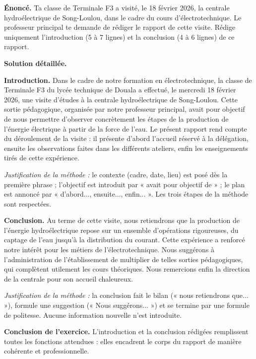 \documentclass[11pt]{article}
\begin{document}
\begin{exoresolu}
\textbf{Énoncé.} Ta classe de Terminale F3 a visité, le 18 février 2026, la centrale hydroélectrique de Song-Loulou, dans le cadre du cours d'électrotechnique. Le professeur principal te demande de rédiger le rapport de cette visite. Rédige uniquement l'introduction (5 à 7 lignes) et la conclusion (4 à 6 lignes) de ce rapport.

\tcblower
\textbf{Solution détaillée.}

\textbf{Introduction.} Dans le cadre de notre formation en électrotechnique, la classe de Terminale F3 du lycée technique de Douala a effectué, le mercredi 18 février 2026, une visite d'études à la centrale hydroélectrique de Song-Loulou. Cette sortie pédagogique, organisée par notre professeur principal, avait pour objectif de nous permettre d'observer concrètement les étapes de la production de l'énergie électrique à partir de la force de l'eau. Le présent rapport rend compte du déroulement de la visite : il présente d'abord l'accueil réservé à la délégation, ensuite les observations faites dans les différents ateliers, enfin les enseignements tirés de cette expérience.

\textit{Justification de la méthode :} le contexte (cadre, date, lieu) est posé dès la première phrase ; l'objectif est introduit par « avait pour objectif de » ; le plan est annoncé par « d'abord..., ensuite..., enfin... ». Les trois étapes de la méthode sont respectées.

\textbf{Conclusion.} Au terme de cette visite, nous retiendrons que la production de l'énergie hydroélectrique repose sur un ensemble d'opérations rigoureuses, du captage de l'eau jusqu'à la distribution du courant. Cette expérience a renforcé notre intérêt pour les métiers de l'électrotechnique. Nous suggérons à l'administration de l'établissement de multiplier de telles sorties pédagogiques, qui complètent utilement les cours théoriques. Nous remercions enfin la direction de la centrale pour son accueil chaleureux.

\textit{Justification de la méthode :} la conclusion fait le bilan (« nous retiendrons que... »), formule une suggestion (« Nous suggérons... ») et se termine par une formule de politesse. Aucune information nouvelle n'est introduite.

\textbf{Conclusion de l'exercice.} L'introduction et la conclusion rédigées remplissent toutes les fonctions attendues : elles encadrent le corps du rapport de manière cohérente et professionnelle.
\end{exoresolu}
\end{document}
